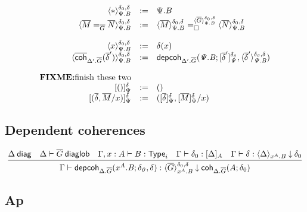 \[
  \begin{array}{rcl}
    \interpdepglob{\diagbase}{\Psi.B}{\delta_0}{\delta} & := & \Psi.B \\
    \interpdepglob{\homj{\diag G}{\diag M}{\diag N}}{\Psi.B}{\delta_0}{\delta} & := &
    \dhomj
      {\interpdepglob{\diag G}{\Psi.B}{\delta_0}{\delta}}
      {\interpdepglob{\diag M}{\Psi.B}{\delta_0}{\delta}}
      {\interpdepglob{\diag N}{\Psi.B}{\delta_0}{\delta}}
      {\blank}
    \\\\

    \interpdepglob{x}{\Psi.B}{\delta_0}{\delta} & := & \delta(x) \\
    \interpdepglob
      {\diagcoh{\Delta'.\diag{G}}{\diag \delta'}}{\Psi.B}{\delta_0}{\delta} & := &
    \depcoh{\Delta'.\diag G}{\Psi.B}
      {\interpglob{\diag\delta'}{\Psi}{\delta_0}}
      {\interpdepglob{\diag\delta'}{\Psi.B}{\delta_0}{\delta}} \\\\

    \FIXME{\text{finish these two}} \\
    \interpglob{()}{\Psi}{\delta} & := & () \\
    \interpglob{(\diag \delta,\diag M/x)}{\Psi}{\delta} & := &
    (\interpglob{\diag\delta}{\Psi}{\delta},\interpglob{\diag
    M}{\Psi}{\delta}/x)
  \end{array}
\]

\subsection{Dependent coherences}

\begin{small}
\[
\infer
  {\ofdepglob{\Gamma}{\depcoh{\Delta.\diag G}{x^A.B}{\delta_0}{\delta}}
    {\interpdepglob{\diag G}{x^A.B}{\delta_0}{\delta}}{\coh{\Delta.\diag G}{A}{\delta_0}}}
  {\wfdiag{\Delta}
  &\wfdiaglob{\Delta}{\diag G}
  &\wftype{\Gamma,x:A}{B}
  &\ofinterp{\Gamma}{\delta_0}{\Delta}{A}
  &\ofinterpdep{\Gamma}{\delta}{\Delta}{x^A.B}{\delta_0}}
\]
\end{small}

\subsection{Ap}

